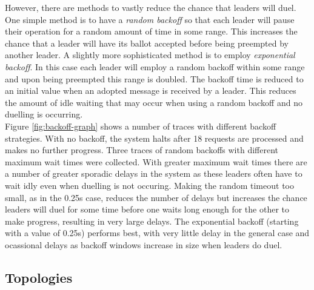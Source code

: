 However, there are methods to vastly reduce the chance that leaders will duel. One simple method is to have a \emph{random backoff} so that each leader will pause their operation for a random amount of time in some range. This increases the chance that a leader will have its ballot accepted before being preempted by another leader. A slightly more sophisticated method is to employ \emph{exponential backoff}. In this case each leader will employ a random backoff within some range and upon being preempted this range is doubled. The backoff time is reduced to an initial value when an adopted message is received by a leader. This reduces the amount of idle waiting that may occur when using a random backoff and no duelling is occurring. \\

Figure \ref{fig:backoff-graph} shows a number of traces with different backoff strategies. With no backoff, the system halts after 18 requests are processed and makes no further progress. Three traces of random backoffs with different maximum wait times were collected. With greater maximum wait times there are a number of greater sporadic delays in the system as these leaders often have to wait idly even when duelling is not occuring. Making the random timeout too small, as in the 0.25s case, reduces the number of delays but increases the chance leaders will duel for some time before one waits long enough for the other to make progress, resulting in very large delays. The exponential backoff (starting with a value of 0.25s) performs best, with very little delay in the general case and ocassional delays as backoff windows increase in size when leaders do duel.

\subsection{Topologies}
\label{section-topo}

